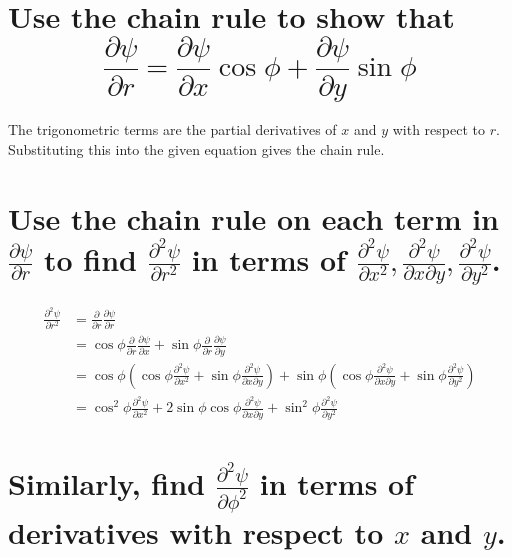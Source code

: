 \documentclass[answers]{exam}
\begin{document}
\begin{questions}
\begin{parts}
	\part{Use the chain rule to show that
		$$\frac{\partial\psi}{\partial r} = \frac{\partial\psi}{\partial x}\cos\phi + \frac{\partial\psi}{\partial y}\sin\phi$$
	}

	\begin{solution}
		The trigonometric terms are the partial derivatives of $x$ and $y$ with respect to $r$. Substituting this into the given equation gives the chain rule.
	\end{solution}

	\part{Use the chain rule on each term in $\frac{\partial\psi}{\partial r}$ to find $\frac{\partial^2\psi}{\partial r^2}$ in terms of $\frac{\partial^2\psi}{\partial x^2}, \frac{\partial^2\psi}{\partial x\partial y}, \frac{\partial^2\psi}{\partial y^2}$.}

	\begin{solution}
		\begin{align*}
			\frac{\partial^2\psi}{\partial r^2} &= \frac{\partial}{\partial r} \frac{\partial\psi}{\partial r} \\
							    &= \cos\phi\frac{\partial}{\partial r}\frac{\partial\psi}{\partial x} + \sin\phi\frac{\partial}{\partial r}\frac{\partial\psi}{\partial y} \\
							    &= \cos\phi\left(\cos\phi\frac{\partial^2\psi}{\partial x^2} + \sin\phi\frac{\partial^2\psi}{\partial x\partial y}\right) + \sin\phi\left(\cos\phi\frac{\partial^2\psi}{\partial x\partial y} + \sin\phi\frac{\partial^2\psi}{\partial y^2}\right) \\
							    &= \cos^2\phi\frac{\partial^2\psi}{\partial x^2} + 2\sin\phi\cos\phi\frac{\partial^2\psi}{\partial x\partial y} + \sin^2\phi\frac{\partial^2\psi}{\partial y^2}
		\end{align*}
	\end{solution}

	\part{Similarly, find $\frac{\partial^2\psi}{\partial\phi^2}$ in terms of derivatives with respect to $x$ and $y$.}


\end{parts}
\end{questions}
\end{document}
